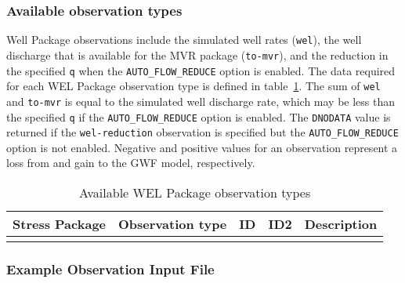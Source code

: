 \subsubsection{Available observation types}
Well Package observations include the simulated well rates (\texttt{wel}), the well discharge that is available for the MVR package (\texttt{to-mvr}), and the reduction in the specified \texttt{q} when the \texttt{AUTO\_FLOW\_REDUCE} option is enabled. The data required for each WEL Package observation type is defined in table~\ref{table:gwf-welobstype}. The sum of \texttt{wel} and \texttt{to-mvr} is equal to the simulated well discharge rate, which may be less than the specified \texttt{q} if the \texttt{AUTO\_FLOW\_REDUCE} option is enabled. The \texttt{DNODATA} value is returned if the \texttt{wel-reduction} observation is specified but the \texttt{AUTO\_FLOW\_REDUCE} option is not enabled. Negative and positive values for an observation represent a loss from and gain to the GWF model, respectively.

\begin{longtable}{p{2cm} p{2.75cm} p{2cm} p{1.25cm} p{7cm}}
\caption{Available WEL Package observation types} \tabularnewline

\hline
\hline
\textbf{Stress Package} & \textbf{Observation type} & \textbf{ID} & \textbf{ID2} & \textbf{Description} \\
\hline
\endhead

\hline
\endfoot


\label{table:gwf-welobstype}
\end{longtable}

\vspace{5mm}
\subsubsection{Example Observation Input File}

